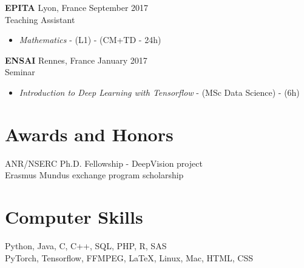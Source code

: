 \documentclass[10pt]{res} %
\begin{document}
\begin{resume}
\textbf{EPITA} \hfill Lyon, France \hfill September 2017 \\
Teaching Assistant
\begin{itemize}
	\item \textit{Mathematics} - (L1) - (CM+TD - 24h)
\end{itemize}

\textbf{ENSAI} \hfill Rennes, France \hfill January 2017 \\
Seminar
\begin{itemize}
\item \textit{Introduction to Deep Learning with Tensorflow} - (MSc Data Science) - (6h)
\end{itemize}


\section{\large Awards and Honors} 
ANR/NSERC Ph.D. Fellowship - DeepVision project \\
Erasmus Mundus exchange program scholarship


\section{\large Computer Skills} 
Python, Java, C, C++, SQL, PHP, R, SAS \\
PyTorch, Tensorflow, FFMPEG, \LaTeX, Linux, Mac, HTML, CSS


\end{resume}
\end{document}
